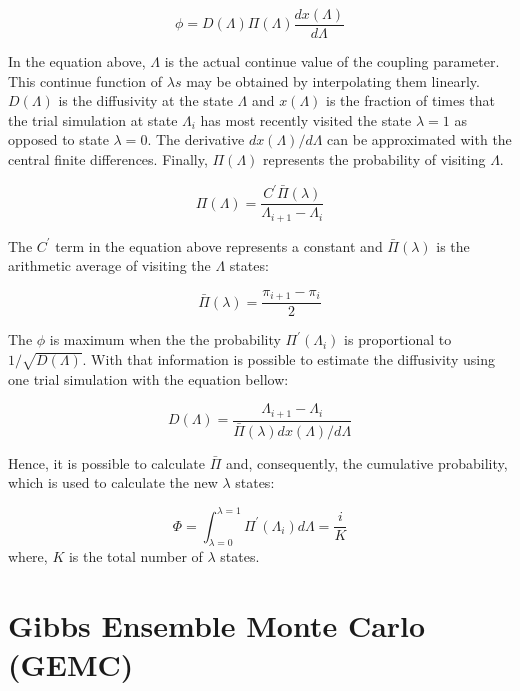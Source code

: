 \begin{equation}
\phi = D(\Lambda) \Pi (\Lambda) \dfrac{dx(\Lambda)}{d \Lambda}
\label{eqn:stream}
\end{equation}

In the equation above, $\Lambda$ is the actual continue value of the coupling parameter. This continue function of $\lambda s$ may be obtained by interpolating them linearly. $D(\Lambda)$ is the diffusivity at the state $\Lambda$ and $x(\Lambda)$ is the fraction of times that the trial simulation at state $\Lambda_{i}$ has most recently visited the state $\lambda=1$ as opposed to state $\lambda=0$. The derivative ${dx(\Lambda)}/{d \Lambda}$ can be approximated with the central finite differences. Finally, $\Pi (\Lambda)$ represents the probability of visiting $\Lambda$. 

\begin{equation}
\Pi (\Lambda) = \dfrac{C^{'} \bar{\Pi} (\lambda)}{\Lambda_{i+1} - \Lambda_{i}}
\label{eqn:plambda}
\end{equation}

The $C^{'} $ term in the equation above represents a constant and $\bar{\Pi} (\lambda)$ is the arithmetic average of visiting the $\Lambda$ states:

\begin{equation}
\bar{\Pi} (\lambda) = \dfrac{\pi_{i+1} - \pi_{i}}{2}
\label{eqn:barplambda}
\end{equation}

The $\phi$ is maximum when the the probability $\Pi^{'}(\Lambda_{i})$ is proportional to $1/\sqrt{D(\Lambda)}$. With that information is possible to estimate the diffusivity using one trial simulation with the equation bellow:

\begin{equation}
D(\Lambda) = \dfrac{\Lambda_{i+1} - \Lambda_{i}}{\bar{\Pi} (\lambda) {dx(\Lambda)}/{d \Lambda}}
\label{eqn:diff}
\end{equation}

Hence, it is possible to calculate $\bar{\Pi} $ and, consequently, the cumulative probability, which is used to calculate the new $\lambda$ states:

\begin{equation}
\Phi = \int_{\lambda =0}^{\lambda =1} \Pi^{'}(\Lambda_{i}) d \Lambda = \dfrac{i}{K}
\label{eqn:cumfun}
\end{equation}
where, $K$ is the total number of $\lambda$ states.

\section{Gibbs Ensemble Monte Carlo (GEMC)}\label{gemc}


